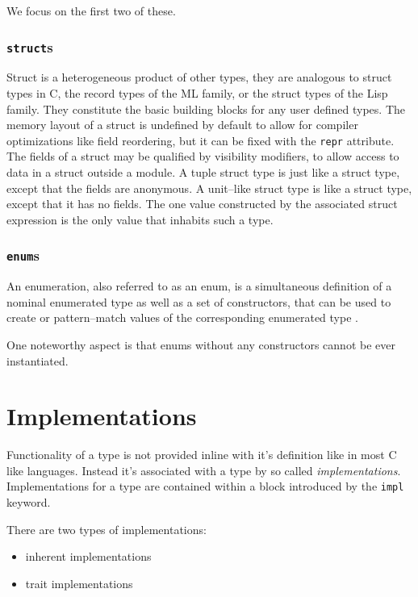 We focus on the first two of these.

\subsubsection{\texttt{struct}s}

Struct is a heterogeneous product of other types, they are analogous to struct types in C, the record types of the ML family, or the struct types of the Lisp family. 
They constitute the basic building blocks for any user defined types. The memory layout of a struct is undefined by default to allow for compiler optimizations like field reordering, 
but it can be fixed with the \texttt{repr} attribute. The fields of a struct may be qualified by visibility modifiers, to allow access to data in a struct outside a module.
A tuple struct type is just like a struct type, except that the fields are anonymous. 
A unit--like struct type is like a struct type, except that it has no fields. The one value constructed by the associated struct expression is the only value that inhabits such a type.
\cite{rustreference}

\subsubsection{\texttt{enum}s}

An enumeration, also referred to as an enum, is a simultaneous definition of a nominal enumerated type as well as a set of constructors, 
that can be used to create or pattern--match values of the corresponding enumerated type \cite{rustreference}.

One noteworthy aspect is that enums without any constructors cannot be ever instantiated.

\section{Implementations}

Functionality of a type is not provided inline with it's definition like in most C like languages. 
Instead it's associated with a type by so called \textit{implementations}.
Implementations for a type are contained within a block introduced by the \texttt{impl} keyword.

There are two types of implementations:
\begin{itemize}
    \item inherent implementations
    \item trait implementations
\end{itemize}

